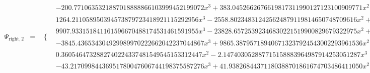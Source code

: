 \documentclass{article}
\begin{document}
\begin{landscape}
\begin{eqnarray*}
\begin{array}{cc}
\end{array}\\
\Psi_{\text{right},2} & = & \begin{array}{cc}
 \{ & 
\begin{array}{cc}
 -200.7710635321887018888866103999452199072 x^3+383.0452662676619817311990127123100909771 x^2-236.0298178948947167148664038327062714514 x+47.20343813245041272292926433714379054358 & x\geq \frac{1}{2}\land x<\frac{5}{8} \\
 1264.211058950394573879723418921115292956 x^3-2558.802348312425624879119814650748709616 x^2+1724.503775545937515256692252260499440778 x-386.6324843194474434878349117221269748914 & x\geq \frac{5}{8}\land x<\frac{3}{4} \\
 9907.933151841161596670488174531461591955 x^3-23828.65725392346830221519900829679322975 x^2+19043.00510220933218030139551763710684142 x-5057.785352849074274009671695601797327687 & x\geq \frac{3}{4}\land x<\frac{7}{8} \\
 -3845.436534304929989970222662042237044867 x^3+9865.387957189406713237924543002293961536 x^2-8331.803019371394983676187994381081686881 x+2311.851596486918260408486113421024770212 & x\geq \frac{7}{8}\land x<1 \\
 0.3605464732882740224337481549545153312447 x^2-2.147403052887715158883964987914253051287 x^3 & x\geq 0\land x<\frac{1}{4} \\
 -43.21709984436951780047606744198375587276 x^3+41.93826844371180388701861674703486411050 x^2-13.08829283680892693699391508590214261060 x+1.315179598417664283986801085315349835533 & x\geq \frac{1}{4}\land x<\frac{1}{2}
\end{array}

\end{array}\end{eqnarray*}
\end{landscape}
\end{document}
